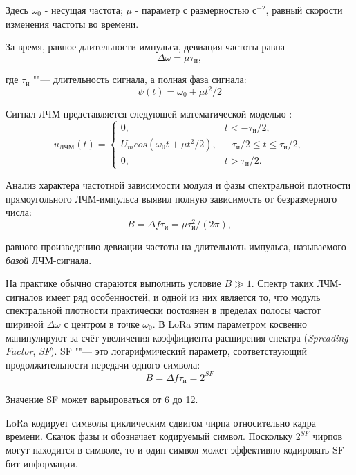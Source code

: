 Здесь $\omega_0$ - несущая частота; $\mu$ - параметр с размерностью с$^{-2}$, равный скорости изменения частоты во времени.

За время, равное длительности импульса, девиация частоты равна
\begin{equation}
	\Delta \omega = \mu \tau_{\text{и}},
\end{equation}

где $\tau_{\text{и}}$ ""--- длительность сигнала, а полная фаза сигнала:
\begin{equation}
	\psi(t) = \omega_0 + \mu t{^2}/2
\end{equation}

Сигнал ЛЧМ представляется следующей математической моделью \cite{Baskakov2003}:
\begin{equation}
	u_\text{ЛЧМ}(t) = 
	\begin{cases}
		0, & t < -\tau_\text{и}/2,\\
		U_m cos(\omega_0 t + \mu t{^2}/2), & -\tau_\text{и}/2 \le t \le \tau_\text{и}/2,\\
		0, & t > \tau_\text{и}/2.
	\end{cases}
\end{equation}

Анализ характера частотной зависимости модуля и фазы спектральной плотности прямоугольного ЛЧМ-импульса выявил \cite{Baskakov2003} полную зависимость от безразмерного числа:
\begin{equation}
	B = \Delta f \tau_\text{и} = \mu \tau^{2}_{\text{и}}/(2\pi),
\end{equation}

равного произведению девиации частоты на длительноть импульса, называемого \textit{базой} ЛЧМ-сигнала.

На практике обычно стараются выполнить условие $B \gg 1$. 
Спектр таких ЛЧМ-сигналов имеет ряд особенностей, и одной из них является то, что модуль спектральной плотности практически постоянен в пределах полосы частот шириной $\Delta \omega$ с центром в точке $\omega_0$.
В LoRa этим параметром косвенно манипулируют за счёт увеличения коэффициента расширения спектра (\textit{Spreading Factor}, \textit{SF}).
SF ""--- это логарифмический параметр, соответствующий продолжительности передачи одного символа:
\begin{equation}
	B = \Delta f \tau_\text{и} = 2^{SF}
\end{equation}

Значение SF может варьироваться от 6 до 12.

LoRa кодирует символы циклическим сдвигом чирпа относительно кадра времени. 
Скачок фазы и обозначает кодируемый символ.
Поскольку $2^{SF}$ чирпов могут находится в символе, то и один символ может эффективно кодировать SF бит информации.

